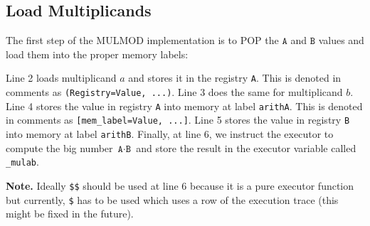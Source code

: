


  



\subsection{Load Multiplicands}

The first step of the MULMOD implementation is to POP the $\texttt{A}$ and $\texttt{B}$ values and load them into the proper memory labels:





Line 2 loads multiplicand $a$ and stores it in the registry \texttt{A}. This is denoted in comments as \texttt{(Registry=Value, ...)}. Line 3 does the same for multiplicand $b$. Line 4 stores the value in registry \texttt{A} into memory at label \texttt{arithA}. This is denoted in comments as \texttt{[mem\_label=Value, ...]}. Line 5 stores the value in registry \texttt{B} into memory at label \texttt{arithB}. Finally, at line 6, we instruct the executor to compute the big number $\texttt{A} \cdot \texttt{B}$ and store the result in the executor variable called \texttt{\_mulab}.

\textbf{Note.} Ideally \texttt{\$\$} should be used at line 6 because it is a pure executor function but currently, \texttt{\$} has to be used which uses a row of the execution trace (this might be fixed in the future).



